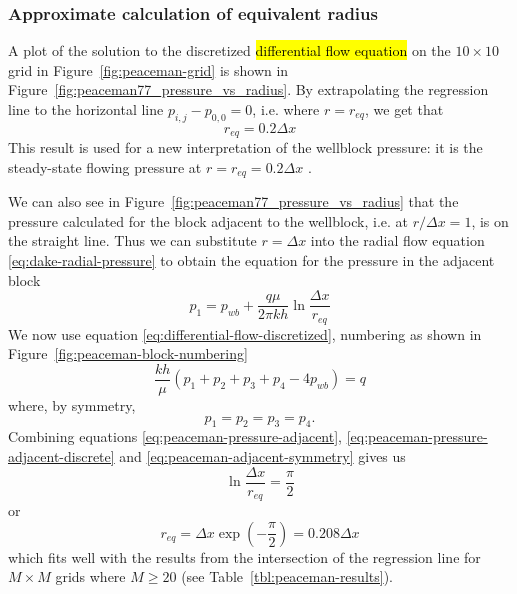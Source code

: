 \subsubsection{Approximate calculation of equivalent radius} %
\label{ssub:approximate_calculation_of_equivalent_radius}
A plot of the solution to the discretized \hl{differential flow equation} on the $10 \times 10$ grid in Figure~\ref{fig:peaceman-grid} is shown in Figure~\ref{fig:peaceman77_pressure_vs_radius}. By extrapolating  the regression line to the horizontal line $p_{i,j}-p_{0,0}=0$, i.e. where $r=r_{eq}$, we get that
\begin{equation}
    r_{eq} = 0.2 \Delta x
\end{equation}
This result is used for a new interpretation of the wellblock pressure: it is the steady-state flowing pressure at $r=r_{eq}=0.2 \Delta x$ \cite{Peaceman1978Interpretation}.

We can also see in Figure~\ref{fig:peaceman77_pressure_vs_radius} that the pressure calculated for the block adjacent to the wellblock, i.e. at $r/\Delta x=1$, is on the straight line. Thus we can substitute $r=\Delta x$ into the radial flow equation \eqref{eq:dake-radial-pressure} to obtain the equation for the pressure in the adjacent block
\begin{equation}
    \label{eq:peaceman-pressure-adjacent}
    p_1 = p_{wb} + \frac{q\mu}{2\pi kh} \ln{\frac{\Delta x}{r_{eq}}}
\end{equation}
We now use equation \eqref{eq:differential-flow-discretized}, numbering as shown in Figure~\ref{fig:peaceman-block-numbering}
\begin{equation}
    \label{eq:peaceman-pressure-adjacent-discrete}
    \frac{kh}{\mu} \left( p_1 + p_2 + p_3 + p_4 -4p_{wb}  \right) = q
\end{equation}
where, by symmetry,
\begin{equation}
    \label{eq:peaceman-adjacent-symmetry}
    p_1=p_2=p_3=p_4.
\end{equation}
Combining equations \eqref{eq:peaceman-pressure-adjacent}, \eqref{eq:peaceman-pressure-adjacent-discrete} and \eqref{eq:peaceman-adjacent-symmetry} gives us
\begin{equation}
    \ln{\frac{\Delta x}{r_{eq}}} = \frac{\pi}{2}
\end{equation}
or
\begin{equation}
    r_{eq} = \Delta x \exp{\left( -\frac{\pi}{2} \right)} = 0.208 \Delta x
\end{equation}
which fits well with the results from the intersection of the regression line for $M\times M$ grids where $M\geq 20$ (see Table~\ref{tbl:peaceman-results}).

